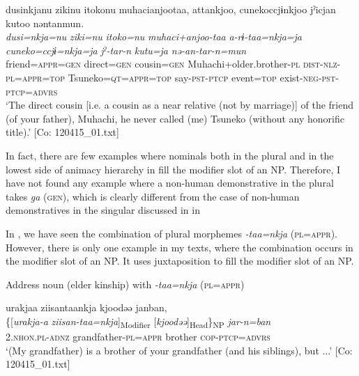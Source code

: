 {\TM}
\glll dusinkjanu  zikinu  {\textbar}itoko{\textbar}nu  muhacianjootaa,     attankjoo,  cunekoccjɨnkjoo  jˀicjan   kutoo  nəntanmun.\\
      \textit{dusi=nkja=nu}  \textit{ziki=nu}  \textit{itoko=nu}  \textit{muhaci+anjoo-taa}   \textit{a-rɨ-taa=nkja=ja}  \textit{cuneko=ccjɨ=nkja=ja}  \textit{jˀ-tar-n}   \textit{kutu=ja}  \textit{nə-an-tar-n=mun}\\
      friend=\textsc{appr}=\textsc{gen}  direct=\textsc{gen}  cousin=\textsc{gen}  Muhachi+older.brother-\textsc{pl} \textsc{dist}-\textsc{nlz}-\textsc{pl}=\textsc{appr}=\textsc{top}  Tsuneko=\textsc{qt}=\textsc{appr}=\textsc{top}  say-\textsc{pst}-\textsc{ptcp}      event=\textsc{top}  exist-\textsc{neg}-\textsc{pst}-\textsc{ptcp}=\textsc{advrs}\\
\glt ‘The direct cousin [i.e. a cousin as a near relative (not by marriage)] of the friend (of your father), Muhachi, he never called (me) Tsuneko (without any honorific title).’ [Co: 120415\_01.txt]
\z
\z

In fact, there are few examples where nominals both in the plural and in the lowest side of animacy hierarchy in  fill the modifier slot of an NP. Therefore, I have not found any example where a non-human demonstrative in the plural takes \textit{ga} (\textsc{gen}), which is clearly different from the case of non-human demonstratives in the singular discussed in  in 

In , we have seen the combination of plural morphemes \textit{-taa=nkja} (\textsc{pl}=\textsc{appr}). However, there is only one example in my texts, where the combination occurs in the modifier slot of an NP. It uses juxtaposition to fill the modifier slot of an NP.

\ea\label{ex:6-114}
  Address noun (elder kinship) with \textit{-taa=nkja} (\textsc{pl}=\textsc{appr})

{\TM}
\glll urakjaa  ziisantaankja  kjoodəə  janban,\\
    \{[\textit{urakja-a}  \textit{ziisan-taa=nkja}]\textsubscript{Modifier}  [\textit{kjoodəə}]\textsubscript{Head}\}\textsubscript{NP}  \textit{jar-n=ban}\\
    2.\textsc{nhon}.\textsc{pl}-\textsc{adnz}  grandfather-\textsc{pl}=\textsc{appr}  brother  \textsc{cop}-\textsc{ptcp}=\textsc{advrs}\\
\glt    ‘(My grandfather) is a brother of your grandfather (and his siblings), but ...’ [Co: 120415\_01.txt]
\z

